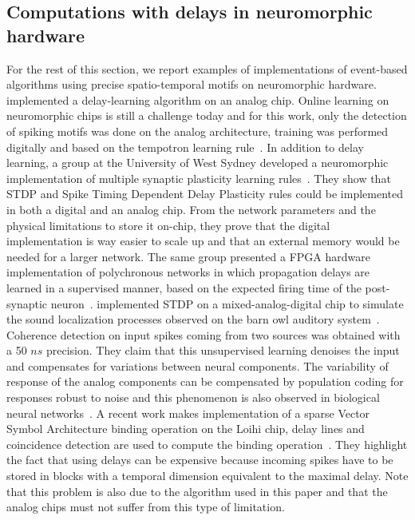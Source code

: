 \documentclass[brainsci, %
               review,submit,pdftex,moreauthors
               ]{Definitions/mdpi}
\begin{document}
\subsection{Computations with delays in neuromorphic hardware}
%
For the rest of this section, we report examples of implementations of event-based algorithms using precise spatio-temporal motifs on neuromorphic hardware. 
\citep{hussain_deltron_2012} implemented a delay-learning algorithm on an analog chip. Online learning on neuromorphic chips is still a challenge today and for this work, only the detection of spiking motifs was done on the analog architecture, training was performed digitally and based on the tempotron learning rule~\citep{gutig_tempotron_2006}. In addition to delay learning, a group at the University of West Sydney developed a neuromorphic implementation of multiple synaptic plasticity learning rules~\citep{wang_neuromorphic_2015}. They show that STDP and Spike Timing Dependent Delay Plasticity rules could be implemented in both a digital and an analog chip. From the network parameters and the physical limitations to store it on-chip, they prove that the digital implementation is way easier to scale up and that an external memory would be needed for a larger network. The same group presented a FPGA hardware implementation of polychronous networks in which propagation delays are learned in a supervised manner, based on the expected firing time of the post-synaptic neuron~\citep{wang_fpga_2014}. %
\citep{pfeil_neuromorphic_2013} implemented STDP on a mixed-analog-digital chip to simulate the sound localization processes observed on the barn owl auditory system~\citep{gerstner_neuronal_1996}. Coherence detection on input spikes coming from two sources was obtained with a 50 $ns$ precision. They claim that this unsupervised learning denoises the input and compensates for variations between neural components. The variability of response of the analog components can be compensated by population coding for responses robust to noise and this phenomenon is also observed in biological neural networks~\citep{boerlin_spike-based_2011}. 
A recent work makes implementation of a sparse Vector Symbol Architecture binding operation on the Loihi chip, delay lines and coincidence detection are used to compute the binding operation~\citep{renner_sparse_2022}. They highlight the fact that using delays can be expensive because incoming spikes have to be stored in blocks with a temporal dimension equivalent to the maximal delay. Note that this problem is also due to the algorithm used in this paper and that the analog chips must not suffer from this type of limitation. 
\end{document}
